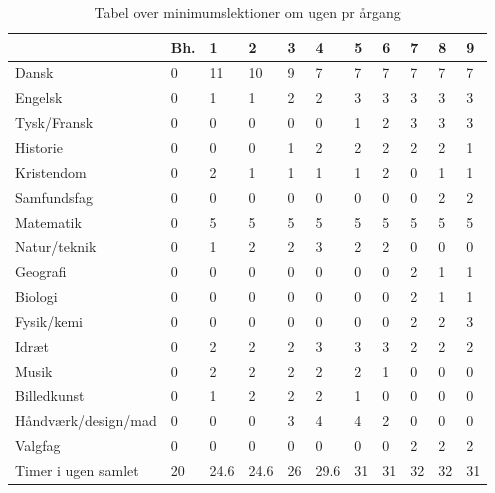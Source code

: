 \begin{table}[h!]
\centering
\begin{tabular}{|l|l|l|l|l|l|l|l|l|l|l|}
\hline
                           & Bh. & 1 & 2 & 3 & 4 & 5 & 6 & 7 & 8 & 9 \\ \hline
Dansk                      & 0   & 11   & 10   & 9    & 7    & 7    & 7    & 7    & 7    & 7    \\ \hline
Engelsk                    & 0   & 1    & 1    & 2    & 2    & 3    & 3    & 3    & 3    & 3    \\ \hline
Tysk/Fransk                & 0   & 0    & 0    & 0    & 0    & 1    & 2    & 3    & 3    & 3    \\ \hline
Historie                   & 0   & 0    & 0    & 1    & 2    & 2    & 2    & 2    & 2    & 1    \\ \hline
Kristendom                 & 0   & 2    & 1    & 1    & 1    & 1    & 2    & 0    & 1    & 1    \\ \hline
Samfundsfag                & 0   & 0    & 0    & 0    & 0    & 0    & 0    & 0    & 2    & 2    \\ \hline
Matematik                  & 0   & 5    & 5    & 5    & 5    & 5    & 5    & 5    & 5    & 5    \\ \hline
Natur/teknik               & 0   & 1    & 2    & 2    & 3    & 2    & 2    & 0    & 0    & 0    \\ \hline
Geografi                   & 0   & 0    & 0    & 0    & 0    & 0    & 0    & 2    & 1    & 1    \\ \hline
Biologi                    & 0   & 0    & 0    & 0    & 0    & 0    & 0    & 2    & 1    & 1    \\ \hline
Fysik/kemi                 & 0   & 0    & 0    & 0    & 0    & 0    & 0    & 2    & 2    & 3    \\ \hline
Idræt                      & 0   & 2    & 2    & 2    & 3    & 3    & 3    & 2    & 2    & 2    \\ \hline
Musik                      & 0   & 2    & 2    & 2    & 2    & 2    & 1    & 0    & 0    & 0    \\ \hline
Billedkunst                & 0   & 1    & 2    & 2    & 2    & 1    & 0    & 0    & 0    & 0    \\ \hline
Håndværk/design/mad & 0   & 0    & 0    & 3    & 4    & 4    & 2    & 0    & 0    & 0    \\ \hline
Valgfag                    & 0   & 0    & 0    & 0    & 0    & 0    & 0    & 2    & 2    & 2    \\ \hline
Timer i ugen samlet        & 20  & 24.6 & 24.6 & 26   & 29.6 & 31   & 31   & 32   & 32   & 31   \\ \hline
\end{tabular}
\caption{Tabel over minimumslektioner om ugen pr årgang}
\label{my-label}
\end{table}


